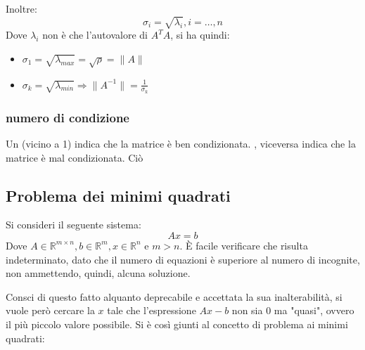 Inoltre:
\[
    \sigma_i =\sqrt{\lambda_i}, i=\dots,n 
\]
Dove $\lambda_i$ non è che l'autovalore di $A^TA$, si ha quindi:
\begin{itemize}
    \item $\sigma_1 =\sqrt{\lambda_{max}}=\sqrt{\rho}=\|A\|$
    \item $\sigma_k =\sqrt{\lambda_{min}} \Rightarrow \|A^{-1}\| = \frac{1}{\sigma_k}$
\end{itemize}

\subsubsection{numero di condizione}

Un  (vicino a 1) indica che la matrice è ben condizionata. , viceversa  indica che la matrice è mal condizionata. Ciò 

\subsection{Problema dei minimi quadrati}
Si consideri il seguente sistema:
\[
    Ax = b    
\]
Dove $A\in \mathbb{R}^{m\times n},b\in \mathbb{R}^m, x\in \mathbb{R}^n$ e $m > n$. È facile verificare che risulta indeterminato, dato che il numero di equazioni è superiore al numero di incognite, non ammettendo, quindi, alcuna soluzione. 

Consci di questo fatto alquanto deprecabile e accettata la sua inalterabilità, si vuole però cercare la $x$ tale che l'espressione $Ax-b$ non sia $0$ ma "quasi", ovvero il più piccolo valore possibile. Si è così giunti al concetto di problema ai minimi quadrati:


